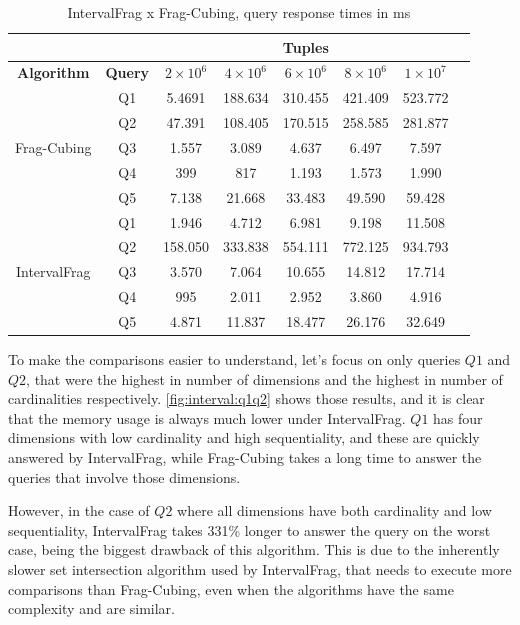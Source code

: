 \begin{table}[!ht]
  \centering
  \caption{IntervalFrag x Frag-Cubing, query response times in ms}\label{tab:interval_query}
  \begin{tabular}{|c|c|c|c|c|c|c|c|}
    \hline
    & & \multicolumn{5}{c|}{\textbf{Tuples}} \\
    \hline
    \bfseries Algorithm & \bfseries Query & \bfseries $2\times10^6$ & \bfseries $4\times10^6$ & \bfseries $6\times10^6$ & \bfseries $8\times10^6$ & \bfseries $1\times10^7$\\
    \hline
    \multirow{5}{*}{Frag-Cubing} & Q1 &
    5.4691 & 188.634 & 310.455 & 421.409 & 523.772
    \\\cline{2-7} & Q2 &
    47.391 & 108.405 & 170.515 & 258.585 & 281.877
    \\\cline{2-7} & Q3 &
    1.557 & 3.089 & 4.637 & 6.497 & 7.597
    \\\cline{2-7} & Q4 &
    399 & 817 & 1.193 & 1.573 & 1.990
    \\\cline{2-7} & Q5 &
    7.138 & 21.668 & 33.483 & 49.590 & 59.428
    \\\hline
    \multirow{5}{*}{IntervalFrag} & Q1 &
    1.946 & 4.712 & 6.981 & 9.198 & 11.508
    \\\cline{2-7}
    & Q2 &
    158.050 & 333.838 & 554.111 & 772.125 & 934.793
    \\\cline{2-7} & Q3 &
    3.570 & 7.064 & 10.655 & 14.812 & 17.714
    \\\cline{2-7}
    & Q4 &
    995 & 2.011 & 2.952 & 3.860 & 4.916
    \\\cline{2-7}
    & Q5 &
    4.871 & 11.837 & 18.477 & 26.176 & 32.649
    \\\hline
  \end{tabular}
\end{table}

To make the comparisons easier to understand, let's focus on only queries $Q1$ and $Q2$, that were the highest in number of dimensions and the highest in number of cardinalities respectively.
\autoref{fig:interval:q1q2} shows those results, and it is clear that the memory usage is always much lower under IntervalFrag.
$Q1$ has four dimensions with low cardinality and high sequentiality, and these are quickly answered by IntervalFrag, while Frag-Cubing takes a long time to answer the queries that involve those dimensions.

However, in the case of $Q2$ where all dimensions have both cardinality and low sequentiality, IntervalFrag takes 331\% longer to answer the query on the worst case, being the biggest drawback of this algorithm.
This is due to the inherently slower set intersection algorithm used by IntervalFrag, that needs to execute more comparisons than Frag-Cubing, even when the algorithms have the same complexity and are similar.

